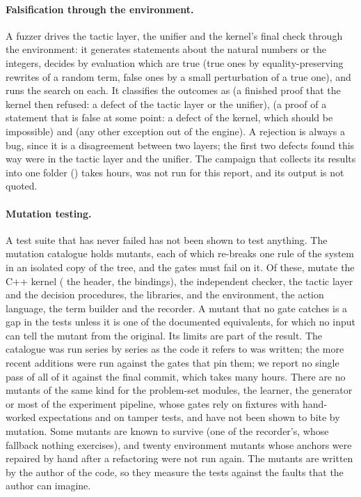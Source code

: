 \paragraph{Falsification through the environment.}
A fuzzer drives the tactic layer, the unifier and the kernel's final check through the environment: it generates statements about the natural numbers or the integers, decides by evaluation which are true (true ones by equality-preserving rewrites of a random term, false ones by a small perturbation of a true one), and runs the search on each.
It classifies the outcomes as  (a finished proof that the kernel then refused: a defect of the tactic layer or the unifier),  (a proof of a statement that is false at some point: a defect of the kernel, which should be impossible) and  (any other exception out of the engine).
A rejection is always a bug, since it is a disagreement between two layers; the first two defects found this way were in the tactic layer and the unifier.
The campaign that collects its results into one folder () takes hours, was not run for this report, and its output is not quoted.

\paragraph{Mutation testing.}
A test suite that has never failed has not been shown to test anything.
The mutation catalogue holds \mutTotal{} mutants, each of which re-breaks one rule of the system in an isolated copy of the tree, and the gates must fail on it.
Of these, \mutKernel{} mutate the C++ kernel (\mutKernelHeader{} the header, \mutBindings{} the bindings), \mutChecker{} the independent checker, \mutTactic{} the tactic layer and the decision procedures, \mutLibrary{} the libraries, and \mutEnv{} the environment, the action language, the term builder and the recorder.
A mutant that no gate catches is a gap in the tests unless it is one of the \mutEquiv{} documented equivalents, for which no input can tell the mutant from the original.
Its limits are part of the result.
The catalogue was run series by series as the code it refers to was written; the more recent additions were run against the gates that pin them; we report no single pass of all of it against the final commit, which takes many hours.
There are no mutants of the same kind for the problem-set modules, the learner, the generator or most of the experiment pipeline, whose gates rely on fixtures with hand-worked expectations and on tamper tests, and have not been shown to bite by mutation.
Some mutants are known to survive (one of the recorder's, whose fallback nothing exercises), and twenty environment mutants whose anchors were repaired by hand after a refactoring were not run again.
The mutants are written by the author of the code, so they measure the tests against the faults that the author can imagine.

